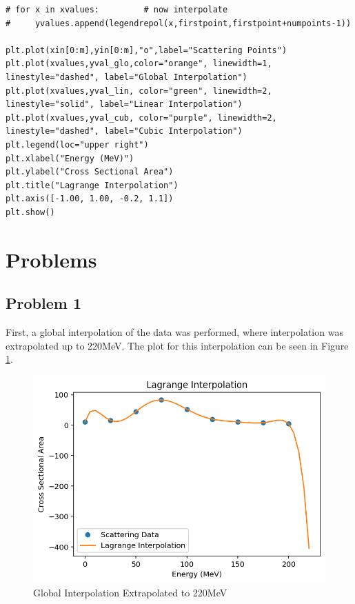 \documentclass[aps,prb,groupedaddress,nofootinbib,floatfix]{revtex4}
\begin{document}
\begin{lstlisting}
# for x in xvalues:         # now interpolate      
#     yvalues.append(legendrepol(x,firstpoint,firstpoint+numpoints-1))
    
plt.plot(xin[0:m],yin[0:m],"o",label="Scattering Points")
plt.plot(xvalues,yval_glo,color="orange", linewidth=1, linestyle="dashed", label="Global Interpolation")
plt.plot(xvalues,yval_lin, color="green", linewidth=2, linestyle="solid", label="Linear Interpolation")
plt.plot(xvalues,yval_cub, color="purple", linewidth=2, linestyle="dashed", label="Cubic Interpolation")
plt.legend(loc="upper right")
plt.xlabel("Energy (MeV)")
plt.ylabel("Cross Sectional Area")
plt.title("Lagrange Interpolation")
plt.axis([-1.00, 1.00, -0.2, 1.1])
plt.show()
\end{lstlisting}
\section*{Problems} 
\subsection*{Problem 1} 
First, a global interpolation of the data was performed, where interpolation was extrapolated up to 220MeV. The plot for this interpolation can be seen in Figure \ref{fig:Plot1}.
\begin{figure}[h]
	\includegraphics[width=8 cm]{Plot1.png}
	\caption{Global Interpolation Extrapolated to 220MeV}
	\label{fig:Plot1}
\end{figure}
\end{document}
